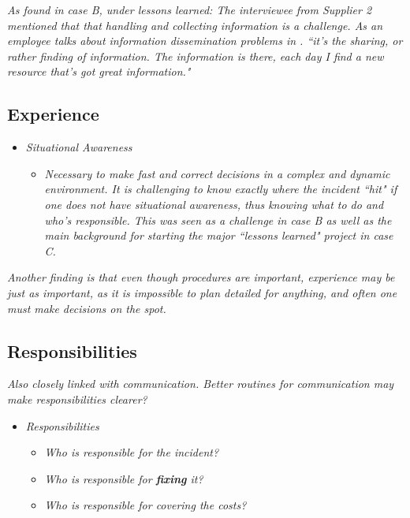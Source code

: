 \textit{As found in case B, under lessons learned:
The interviewee from Supplier 2 mentioned that that handling and collecting information is a challenge. As an employee talks about information dissemination problems in \cite{ahmad2012incident}.
``it's the sharing, or rather finding of information. The information is there, each day I find a new resource that's got great information."}

\subsection{Experience}

\begin{itemize}
\item \textit{Situational Awareness}
\begin{itemize}
\item\textit{ Necessary to make fast and correct decisions in a complex and dynamic environment. It is challenging to know exactly where the incident ``hit" if one does not have situational awareness, thus knowing what to do and who's responsible. This was  seen as a challenge in case B as well as the main background for starting the major ``lessons learned" project in case C.}
\end{itemize}
\end{itemize}

\textit{Another finding is that even though procedures are important, experience may be just as important, as it is impossible to plan detailed for anything, and often one must make decisions on the spot.}

\subsection{Responsibilities}
\textit{Also closely linked with communication. Better routines for communication may make responsibilities clearer?}

\begin{itemize}
\item \textit{Responsibilities}
\begin{itemize}
\item \textit{Who is responsible for the incident?}
\item \textit{Who is responsible for \textbf{fixing} it?}
\item \textit{Who is responsible for covering the costs?}
\end{itemize}
\end{itemize}

